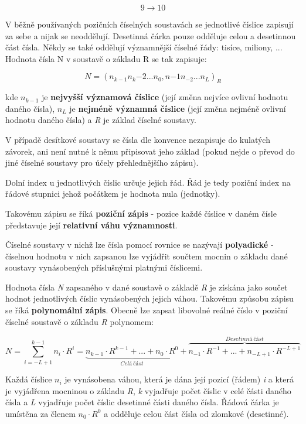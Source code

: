 $$ 9 \rightarrow 10 $$


V běžně používaných pozičních číselných soustavách se jednotlivé číslice zapisují za sebe a nijak se neoddělují. Desetinná čárka pouze odděluje celou a desetinnou část čísla. Někdy se také oddělují významnější číselné řády: tisíce, miliony, ...  Hodnota čísla N v soustavě o základu R se tak zapisuje:

$$ N = (n_{k-1} n_k{-2}... n_0, n{-1} n_{-2}...n_L)_R $$

kde $n_{k-1}$ je {\bf nejvyšší významová číslice} (její změna nejvíce ovlivní hodnotu daného čísla), $n_L$ je {\bf nejméně významná číslice} (její změna nejméně ovlivní hodnotu daného čísla) a {\it R} je základ číselné soustavy.

V případě desítkové soustavy se čísla dle konvence nezapisuje do kulatých závorek, ani není nutné k němu připisovat jeho základ (pokud nejde o převod do jiné číselné soustavy pro účely přehlednějšího zápisu).

Dolní index u jednotlivých číslic určuje jejich řád. Řád je tedy poziční index na řádové stupnici jehož počátkem je hodnota nula (jednotky).

\vskip 4mm
\centerline{}
\vskip 4mm

Takovému zápisu se říká {\bf poziční zápis} - pozice každé číslice v daném čísle představuje její {\bf relativní váhu významnosti}.

Číselné soustavy v nichž lze čísla pomocí rovnice se nazývají {\bf polyadické} - číselnou hodnotu v nich zapsanou lze vyjádřit součtem mocnin o základu dané soustavy vynásobených příslušnými platnými číslicemi.


Hodnota čísla {\it N} zapsaného v dané soustavě o základě {\it R} je získána jako součet hodnot jednotlivých číslic vynásobených jejich váhou. Takovému způsobu zápisu se říká {\bf polynomální zápis}. Obecně lze zapsat libovolné reálné číslo v poziční číselné soustavě o základu {\it R} polynomem:

$$ N=\sum_{i=-L+1}^{k-1} n_i \cdot R^i = \underbrace{n_{k-1} \cdot R^{k-1} + ... + n_{0} \cdot R^{0}}_{Celá~část} + \overbrace{n_{-1} \cdot R^{-1} + ... + n_{-L+1}\cdot R^{-L+1}}^{Desetinná~část}$$

Každá číslice $n_i$ je vynásobena váhou, která je dána její pozicí (řádem) {\it i} a která je vyjádřena mocninou o základu {\it R}, {\it k} vyjadřuje počet číslic v celé části daného čísla a {\it L} vyjadřuje počet číslic desetinné části daného čísla. Řádová čárka je umístěna za členem $n_0\cdot R^0$ a odděluje celou část čísla od zlomkové (desetinné).

